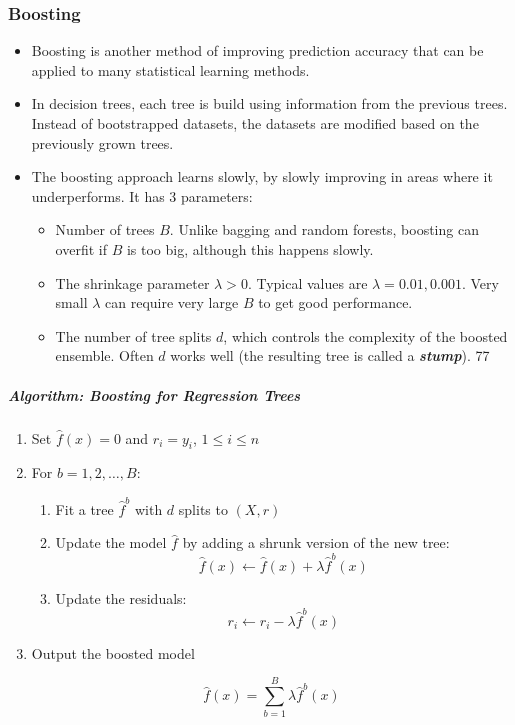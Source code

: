 \documentclass[11pt]{article}
\providecommand{\tightlist}{%
      \setlength{\itemsep}{0pt}\setlength{\parskip}{0pt}}
\begin{document}
    \hypertarget{boosting}{%
\subsubsection{Boosting}\label{boosting}}

    \begin{itemize}
\tightlist
\item
  Boosting is another method of improving prediction accuracy that can
  be applied to many statistical learning methods.
\item
  In decision trees, each tree is build using information from the
  previous trees. Instead of bootstrapped datasets, the datasets are
  modified based on the previously grown trees.
\item
  The boosting approach learns slowly, by slowly improving in areas
  where it underperforms. It has 3 parameters:

  \begin{itemize}
  \tightlist
  \item
    Number of trees \(B\). Unlike bagging and random forests, boosting
    can overfit if \(B\) is too big, although this happens slowly.
  \item
    The shrinkage parameter \(\lambda > 0\). Typical values are
    \(\lambda = 0.01, 0.001\). Very small \(\lambda\) can require very
    large \(B\) to get good performance.
  \item
    The number of tree splits \(d\), which controls the complexity of
    the boosted ensemble. Often \(d\) works well (the resulting tree is
    called a \textbf{\emph{stump}}). 77
  \end{itemize}
\end{itemize}

    \hypertarget{algorithm-boosting-for-regression-trees}{%
\subparagraph{Algorithm: Boosting for Regression
Trees}\label{algorithm-boosting-for-regression-trees}}

    \begin{enumerate}
\def\labelenumi{\arabic{enumi}.}
\item
  Set \(\hat{f}(x) = 0\) and \(r_i = y_i\),
  \(1 \leqslant i \leqslant n\)
\item
  For \(b = 1, 2, \dots, B\):

  \begin{enumerate}
  \def\labelenumii{\arabic{enumii}.}
  \tightlist
  \item
    Fit a tree \(\hat{f}^b\) with \(d\) splits to \((X, r)\)
  \item
    Update the model \(\hat{f}\) by adding a shrunk version of the new
    tree: \[ \hat{f}(x) \leftarrow \hat{f}(x) + \lambda \hat{f}^b(x)\]
  \item
    Update the residuals: \[ r_i \leftarrow r_i - \lambda \hat{f}^b(x)\]
  \end{enumerate}
\item
  Output the boosted model

  \[ \hat{f}(x) = \sum_{b = 1}^B \lambda \hat{f}^b(x)\]
\end{enumerate}
\end{document}
